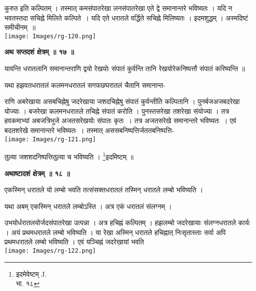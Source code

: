 \documentclass[11pt, openany]{book}
\begin{document}
 \begin{vwcol}[widths={0.65,0.35}, sep=.8cm, rule=0pt] 
 कुरुत इति कल्पितम्  । तस्मात् कमसंपातरेखा लनसंपातरेखा एते द्वे समानान्तरे भविष्यतः  । यदि न भवतस्तदा सचिह्ने मिलिते कल्पिते~। यदि एते धरातले वर्द्धिते सचिह्ने मिलिष्यतः । इदमशुद्धम्  । अस्मदिष्टं समीचीनम्~॥\\
\noindent \texttt{[image: Images/rg-120.png]}
\end{vwcol}

\newpage
\begin{center}
\textbf{\large अथ सप्तदशं क्षेत्रम् ॥ १७ ॥}
\end{center}
\vspace{5mm}

{\ab यावन्ति धरातलानि समानान्तराणि द्वयो रेखयोः संपातं
कुर्वन्ति तानि रेखयोरेकनिष्पत्तौ संपातं करिष्यन्ति ॥}\\
\vspace{3mm}

यथा हझवतधरातलं कलमनधरातलं सगफछघरातलं चैतानि समानान्त-

 \begin{vwcol}[widths={0.7,0.3}, sep=.8cm, rule=0pt] 
राणि अबरेखाया असबचिह्नेषु
जदरेखाया जशदचिह्नेषु संपातं कुर्वन्तीति कल्पितानि  । पुनर्बजअजबदरेखा योज्याः  ।
बजरेखा कलमनधरातले तचिह्ने संपातं करोति । पुनस्तसरेखा तशरेखा संयोज्या  । तत्र
हवकमाभ्यां अबजत्रिभुजे अजतसरेखयोः संपातः कृतः~। तत्र अजतसरेखे समानान्तरे भविष्यतः~। एवं बदतशरेखे समानान्तरे भविष्यतः~। तस्मात् अससबनिष्पत्तिर्जततबनिष्पत्ति-\\
\noindent \texttt{[image: Images/rg-121.png]}
\end{vwcol}
\vspace{-9mm}

\noindent तुल्या जशशदनिष्पत्तितुल्या च भविष्यति । \renewcommand{\thefootnote}{१}\footnote{इदमेवेष्टम् {\en J.}\\
भा. १८
}इदमिष्टम् ॥\\
\begin{center}
\textbf{\large अथाष्टादशं क्षेत्रम् ॥ १८ ॥}
\end{center}
\vspace{5mm}

{\ab एकस्मिन् धरातले यो लम्बो भवति तत्संसक्तधरातलं तस्मिन् धरातले लम्बो भविष्यति ।}\\
\vspace{3mm}

 यथा अबम् एकस्मिन् धरातले लम्बोऽस्ति । अत्र एकं धरातलं
संलग्नम् । 
 \begin{vwcol}[widths={0.66,0.34}, sep=.8cm, rule=0pt]
उभयोर्धरातलयोर्जदसंपातरेखा उत्पन्ना । अत्र हचिह्नं कल्पितम् । हझलम्बो जदरेखायाः संलग्नधरातले कार्यः । अयं प्रथमधरातले लम्बो भविष्यति । या रेखा अस्मिन् धरातले हचिह्नात् निःसृतास्ताः सर्वा अपि प्रथमधरातले लम्बो भविष्यति । एवं यञ्चिह्नं जदरेखायां भवति  \\
\noindent \texttt{[image: Images/rg-122.png]}
\end{vwcol}
\vspace{-1mm}
\end{document}
